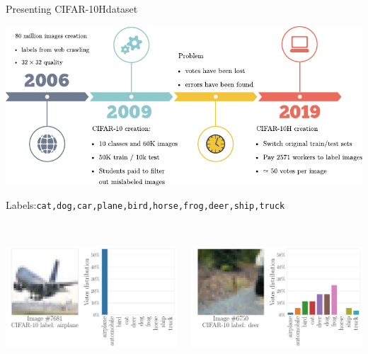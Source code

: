 \begin{frame}{Presenting CIFAR-10Hdataset}{}
    \begin{center}
    \includegraphics[width=.75\textwidth]{./images/cifar-10h_creation.pdf}
    \end{center}
    Labels:\texttt{cat,dog,car,plane,bird,horse,frog,deer,ship,truck}
    \pause
    \begin{columns}
        \begin{column}{.33\textwidth}
            \    \includegraphics[width=\textwidth]{../chapters/images/image_n_hist7681_paper.pdf}
        \end{column}
        \begin{column}{.33\textwidth}
            \    \includegraphics[width=\textwidth]{../chapters/images/image_n_hist6750_paper.pdf}


\end{column}
\end{columns}
\end{frame}
